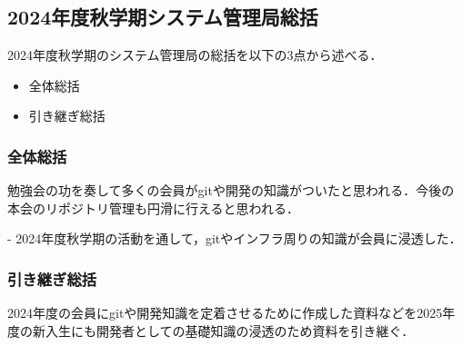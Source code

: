 \subsection*{2024年度秋学期システム管理局総括}


2024年度秋学期のシステム管理局の総括を以下の3点から述べる．
\begin{itemize}
    \item 全体総括
    \item 引き継ぎ総括
\end{itemize}

\subsubsection*{全体総括}
勉強会の功を奏して多くの会員がgitや開発の知識がついたと思われる．今後の本会のリポジトリ管理も円滑に行えると思われる．

- 2024年度秋学期の活動を通して，gitやインフラ周りの知識が会員に浸透した．

\subsubsection*{引き継ぎ総括}
2024年度の会員にgitや開発知識を定着させるために作成した資料などを2025年度の新入生にも開発者としての基礎知識の浸透のため資料を引き継ぐ．
